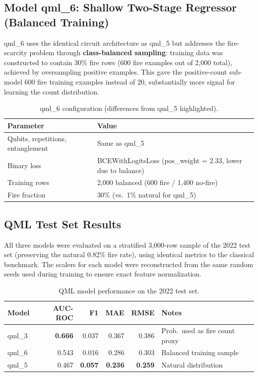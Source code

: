\documentclass[11pt,a4paper]{article}
\begin{document}
\subsection{Model qml\_6: Shallow Two-Stage Regressor (Balanced Training)}

qml\_6 uses the identical circuit architecture as qml\_5 but addresses the
fire-scarcity problem through \textbf{class-balanced sampling}: training data
was constructed to contain 30\% fire rows (600 fire examples out of 2,000 total),
achieved by oversampling positive examples. This gave the positive-count
sub-model 600 fire training examples instead of 20, substantially more
signal for learning the count distribution.

\begin{table}[H]
\centering
\caption{qml\_6 configuration (differences from qml\_5 highlighted).}
\begin{tabular}{ll}
\toprule
\textbf{Parameter} & \textbf{Value} \\
\midrule
Qubits, repetitions, entanglement & Same as qml\_5 \\
Binary loss & BCEWithLogitsLoss (pos\_weight = 2.33, lower due to balance) \\
Training rows & 2,000 balanced (600 fire / 1,400 no-fire) \\
Fire fraction & 30\% (vs.\ 1\% natural for qml\_5) \\
\bottomrule
\end{tabular}
\label{tab:qml6_config}
\end{table}

\subsection{QML Test Set Results}
\label{sec:qml_results}

All three models were evaluated on a stratified 3,000-row sample of the
2022 test set (preserving the natural 0.82\% fire rate), using identical
metrics to the classical benchmark. The scalers for each model were
reconstructed from the same random seeds used during training to ensure
exact feature normalization.

\begin{table}[H]
\centering
\caption{QML model performance on the 2022 test set.}
\begin{tabular}{lrrrrl}
\toprule
\textbf{Model} & \textbf{AUC-ROC} & \textbf{F1} & \textbf{MAE} & \textbf{RMSE} & \textbf{Notes} \\
\midrule
qml\_3 & \textbf{0.666} & 0.037 & 0.367 & 0.386 & Prob.\ used as fire count proxy \\
qml\_6 & 0.543 & 0.016 & 0.286 & 0.303 & Balanced training sample \\
qml\_5 & 0.467 & \textbf{0.057} & \textbf{0.236} & \textbf{0.259} & Natural distribution \\
\bottomrule
\end{tabular}
\label{tab:qml_results}
\end{table}
\end{document}

